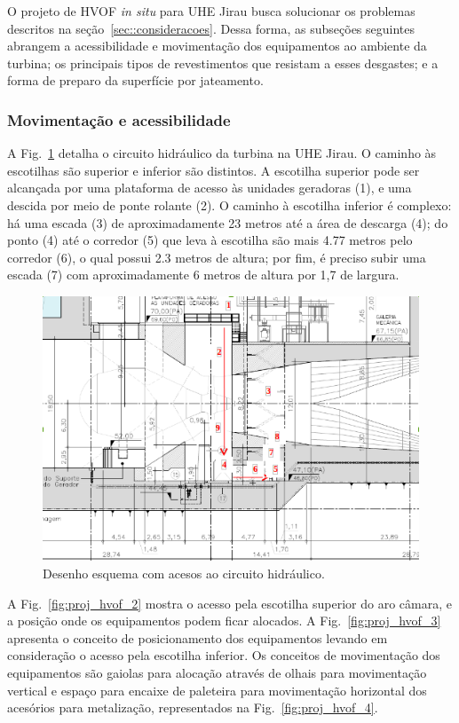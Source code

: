 O projeto de HVOF \textit{in situ} para UHE Jirau busca solucionar os problemas
descritos na seção~\ref{sec::consideracoes}. Dessa forma, as subseções seguintes
abrangem a acessibilidade e movimentação dos equipamentos ao ambiente da
turbina; os principais tipos de revestimentos que resistam a esses desgastes; e
a forma de preparo da superfície por jateamento.

\subsubsection{Movimentação e acessibilidade}
A Fig.~\ref{fig:proj_hvof_1} detalha o circuito hidráulico da turbina na UHE
Jirau. O caminho às escotilhas são superior e inferior são distintos. A
escotilha superior pode ser alcançada por uma plataforma de acesso às unidades
geradoras (1), e uma descida por meio de ponte rolante (2). O caminho à
escotilha inferior é complexo: há uma escada (3) de
aproximadamente 23 metros até a área de descarga (4); do ponto (4) até o
corredor (5) que leva à escotilha são mais 4.77 metros pelo corredor (6), o qual
possui 2.3 metros de altura; por fim, é preciso subir uma escada (7) com
aproximadamente 6 metros de altura por 1,7 de largura.

\begin{figure}
	\centering
	\includegraphics[width=1\columnwidth]{sota/figs/projeto/proj_hvof_1.png}
    \caption{Desenho esquema com acesos ao circuito hidráulico.}
    \label{fig:proj_hvof_1}
\end{figure}

A Fig.~\ref{fig:proj_hvof_2} mostra o acesso pela escotilha superior
do aro câmara, e a posição onde os equipamentos podem ficar alocados. A
Fig.~\ref{fig:proj_hvof_3} apresenta o conceito de posicionamento dos
equipamentos levando em consideração o acesso pela escotilha inferior.
Os conceitos de movimentação dos equipamentos são gaiolas para alocação através
de olhais para movimentação vertical e espaço para encaixe de paleteira para
movimentação horizontal dos acesórios para metalização, representados na
Fig.~\ref{fig:proj_hvof_4}.

